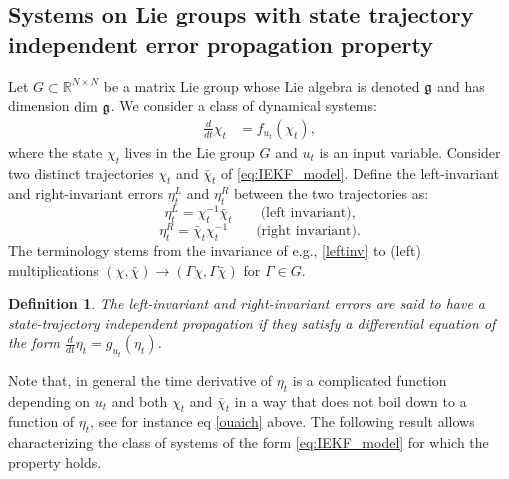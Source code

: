 \documentclass[a4paper,12pt,onecolumn]{article}
\newtheorem{defn}{Definition}
\newcommand{\RR}{{\mathbb{R}}}
\begin{document}
\subsection{Systems on Lie groups with state trajectory independent error propagation property}

Let $G\subset \RR^{N\times N}$ be a matrix Lie group whose Lie algebra is denoted $\frak{g}$ and has dimension $\mathrm{dim}~\frak{g}$. We consider a class of dynamical systems:
\begin{align}
\frac{d}{dt}\chi_t & = f_{u_t}(\chi_t), \label{eq:IEKF_model}
\end{align}
where the state $\chi_t$ lives in the Lie group $G$ and ${u_t}$ is an input variable. Consider two distinct trajectories $\chi_t$ and $\bar\chi_t$ of \eqref{eq:IEKF_model}.  Define the left-invariant and right-invariant errors  $\eta_t^L$ and $\eta_t^R$ between the two trajectories as:
\begin{equation}
\eta_t^L=\chi_t^{-1} \bar{\chi}_t \qquad \text{(left invariant),}\label{leftinv}
\end{equation}
\begin{equation}
\eta_t^R=\bar{\chi}_t \chi_t^{-1} \qquad \text{(right invariant).}\label{rightinv}
\end{equation}
The  terminology stems from the invariance of e.g.,  \eqref{leftinv} to (left) multiplications $(\chi,\bar\chi)\to(\Gamma\chi,\Gamma\bar\chi)$ for $\Gamma\in G$. 
\begin{defn}
The left-invariant and right-invariant errors are said to have a  state-trajectory independent propagation if they satisfy a differential equation of the form $\frac{d}{dt}\eta_t = g_{u_t}(\eta_t)$.
\end{defn}

Note that, in general the time derivative of $\eta_t$ is a complicated function depending on $u_t$ and both $\chi_t$ and $\bar{\chi}_t$ in a way that does not boil down to a function of $\eta_t$, see for instance eq \eqref{ouaich} above. The following result allows characterizing the class of systems of the form \eqref{eq:IEKF_model} for which the property holds. 
\end{document}
